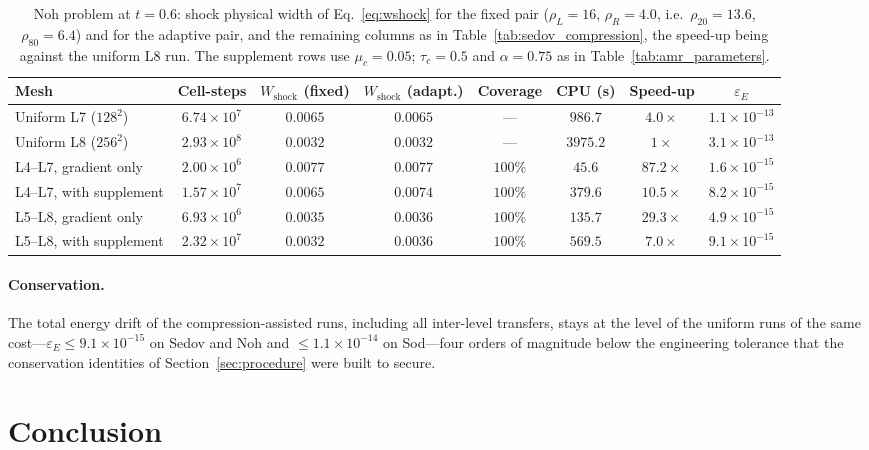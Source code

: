 \documentclass[a4paper]{cas-sc}
\begin{document}
\begin{table}[pos=htbp]
	\centering
	\caption{Noh problem at $t=0.6$: shock physical width of
	Eq.~\eqref{eq:wshock} for the fixed pair ($\rho_L=16$, $\rho_R=4.0$,
	i.e.\ $\rho_{20}=13.6$, $\rho_{80}=6.4$) and for the adaptive pair, and
	the remaining columns as in Table~\ref{tab:sedov_compression}, the speed-up
	being against the uniform L8 run. The supplement rows use $\mu_c=0.05$;
	$\tau_c=0.5$ and $\alpha=0.75$ as in Table~\ref{tab:amr_parameters}.}
	\label{tab:noh_compression}
	\begin{tabular}{lccccccc}
		\hline
		Mesh & Cell-steps & $W_{\mathrm{shock}}$ (fixed) & $W_{\mathrm{shock}}$ (adapt.) & Coverage & CPU (s) & Speed-up & $\varepsilon_E$ \\
		\hline
		Uniform L7 ($128^2$)    & $6.74\times10^{7}$ & $0.0065$ & $0.0065$ & ---      & $986.7$  & $4.0\times$  & $1.1\times10^{-13}$ \\
		Uniform L8 ($256^2$)    & $2.93\times10^{8}$ & $0.0032$ & $0.0032$ & ---      & $3975.2$ & $1\times$    & $3.1\times10^{-13}$ \\
		L4--L7, gradient only   & $2.00\times10^{6}$ & $0.0077$ & $0.0077$ & $100\%$  & $45.6$   & $87.2\times$ & $1.6\times10^{-15}$ \\
		L4--L7, with supplement & $1.57\times10^{7}$ & $0.0065$ & $0.0074$ & $100\%$  & $379.6$  & $10.5\times$ & $8.2\times10^{-15}$ \\
		L5--L8, gradient only   & $6.93\times10^{6}$ & $0.0035$ & $0.0036$ & $100\%$  & $135.7$  & $29.3\times$ & $4.9\times10^{-15}$ \\
		L5--L8, with supplement & $2.32\times10^{7}$ & $0.0032$ & $0.0036$ & $100\%$  & $569.5$  & $7.0\times$  & $9.1\times10^{-15}$ \\
		\hline
	\end{tabular}
\end{table}

\paragraph{Conservation.}
The total energy drift of the compression-assisted runs, including all
inter-level transfers, stays at the level of the uniform runs of the same
cost---$\varepsilon_E\le9.1\times10^{-15}$ on Sedov and Noh and
$\le1.1\times10^{-14}$ on Sod---four orders of magnitude below the engineering
tolerance that the conservation identities of Section~\ref{sec:procedure} were
built to secure.


\section{Conclusion}
\label{sec:conclusion}
\end{document}
